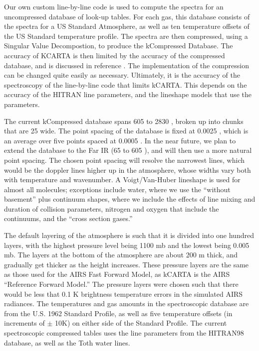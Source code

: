 \documentclass[11pt]{article}
\begin{document}
Our own custom line-by-line code is used to compute the spectra for an 
uncompressed database of look-up tables. For each gas, this database 
consists of the spectra 
for a US Standard Atmosphere, as well as ten temperature offsets of the US 
Standard temperature profile. The spectra are then compressed, using a 
Singular Value Decompostion, to produce the kCompressed Database. The 
accuracy of \textsf{KCARTA} is then limited by the accuracy of the compressed 
database, and is discussed in reference \cite{str:97}. The implementation of 
the compression can be changed quite easily as necessary. Ultimately, it is 
the accuracy of the spectroscopy of the line-by-line code that limits 
\textsf{kCARTA}. This depends on the accuracy of the \textsf{HITRAN} line 
parameters, and the lineshape models that use the parameters. 

The current kCompressed database spans 605 \wn to 2830 \wn, broken up into 
chunks that are 25 \wn wide. The point spacing of the database is fixed at 
0.0025 \wn, which is an average over five points spaced at 0.0005 \wn. In the 
near future, we plan to extend the database to the Far IR (65 \wn to 605 \wn),
and will then use a more natural point spacing. The chosen point spacing will 
resolve the narrowest lines, which would be the doppler lines higher up in 
the atmosphere, whose widths vary both with 
temperature and wavenumber. A Voigt/Van-Huber lineshape is used for almost
all molecules; exceptions include water, where we use the ``without basement''
plus continuum shapes, \cd where we include the effects of line mixing and 
duration of collision parameters, nitrogen and oxygen that include the
continuums, and the ``cross section gases.''

The default layering of the atmosphere is such that it is divided into one 
hundred layers, with the highest pressure level being 1100 mb and the lowest 
being 0.005 mb. The layers at the bottom of the atmosphere are about 200 m 
thick, 
and gradually get thicker as the height increases. These pressure layers are 
the same as those used for the AIRS Fast Forward Model, 
as {\sf kCARTA} is the AIRS ``Reference Forward Model.''  
The pressure layers were chosen such that there would be less that 0.1 K 
brightness temperature errors in the simulated AIRS radiances. The 
temperatures and gas amounts in the spectroscopic database are from the 
U.S. 1962 Standard 
Profile, as well as five temperature offsets (in increments of $\pm$ 10K) on 
either side of the Standard Profile.  The current spectroscopic compressed 
tables uses the line parameters from the \textsf{HITRAN98} database, as well
as the Toth water lines.
\end{document}
